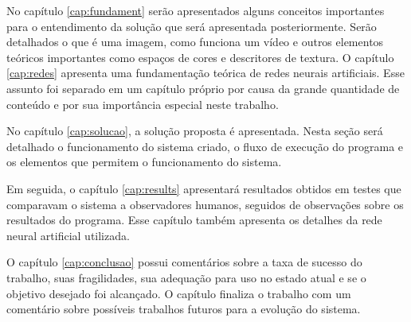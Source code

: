			No capítulo \ref{cap:fundament} serão apresentados alguns conceitos importantes para o entendimento da solução que será apresentada posteriormente. Serão detalhados o que é uma imagem, como funciona um vídeo e outros elementos teóricos importantes como espaços de cores e descritores de textura. O capítulo \ref{cap:redes} apresenta uma fundamentação teórica de redes neurais artificiais. Esse assunto foi separado em um capítulo próprio por causa da grande quantidade de conteúdo e por sua importância especial neste trabalho.
			
			No capítulo \ref{cap:solucao}, a solução proposta é apresentada. Nesta seção será detalhado o funcionamento do sistema criado, o fluxo de execução do programa e os elementos que permitem o funcionamento do sistema.
			
			Em seguida, o capítulo \ref{cap:results} apresentará resultados obtidos em testes que comparavam o sistema a observadores humanos, seguidos de observações sobre os resultados do programa. Esse capítulo também apresenta os detalhes da rede neural artificial utilizada.
			
			O capítulo \ref{cap:conclusao} possui comentários sobre a taxa de sucesso do trabalho, suas fragilidades, sua adequação para uso no estado atual e se o objetivo desejado foi alcançado. O capítulo finaliza o trabalho com um comentário sobre possíveis trabalhos futuros para a evolução do sistema.
			
			








